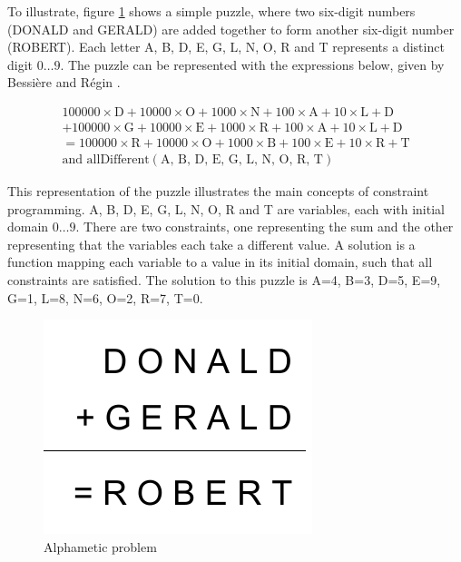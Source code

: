 \documentclass[oneside]{book}
\begin{document}
To illustrate, figure \ref{fig:Alphametic-problem} shows a simple
puzzle, where two six-digit numbers (DONALD and GERALD) are added
together to form another six-digit number (ROBERT). Each letter A,
B, D, E, G, L, N, O, R and T represents a distinct digit $0\ldots9$.
The puzzle can be represented with the expressions below, given by
Bessi\`ere and R\'egin \cite{bessiere-gac-schema}.

\begin{eqnarray*}
100000\times\textrm{D}+10000\times\textrm{O}+1000\times\textrm{N}+100\times\textrm{A}+10\times\textrm{L}+\textrm{D}\\
+100000\times\textrm{G}+10000\times\textrm{E}+1000\times\textrm{R}+100\times\textrm{A}+10\times\textrm{L}+\textrm{D}\\
=100000\times\textrm{R}+10000\times\textrm{O}+1000\times\textrm{B}+100\times\textrm{E}+10\times\textrm{R}+\textrm{T}\\
\textrm{and allDifferent}(\textrm{A, B, D, E, G, L, N, O, R, T})\end{eqnarray*}


This representation of the puzzle illustrates the main concepts of
constraint programming. A, B, D, E, G, L, N, O, R and T are variables,
each with initial domain $0\ldots9$. There are two constraints, one
representing the sum and the other representing that the variables
each take a different value. A solution is a function mapping each
variable to a value in its initial domain, such that all constraints
are satisfied. The solution to this puzzle is A=4, B=3, D=5, E=9,
G=1, L=8, N=6, O=2, R=7, T=0.

\begin{figure}
\begin{centering}
\includegraphics[scale=0.5]{litreview-example-alphametic}
\par\end{centering}
\caption{\label{fig:Alphametic-problem}Alphametic problem}
\end{figure}
\end{document}
